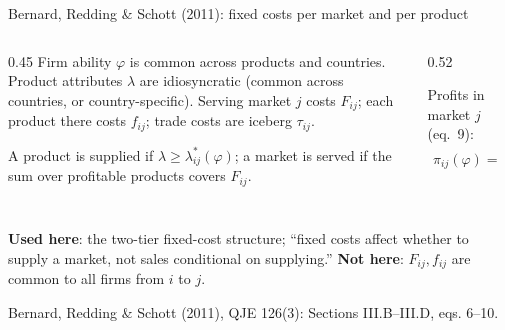 \documentclass[11pt,aspectratio=169,notes]{beamer}
\newcommand{\src}[1]{\par\vfill{\color{mute}\scriptsize #1\par}}
\begin{document}
\begin{frame}{Bernard, Redding \& Schott (2011): fixed costs per market and per product}
\vspace{0.15cm}
\begin{columns}[T]
\begin{column}{0.45\textwidth}
{\footnotesize Firm ability $\varphi$ is common across products and countries. Product attributes $\lambda$ are idiosyncratic (common across countries, or country-specific). Serving market $j$ costs $F_{ij}$; each product there costs $f_{ij}$; trade costs are iceberg $\tau_{ij}$.}
\vspace{0.2cm}

{\footnotesize A product is supplied if $\lambda\ge\lambda^*_{ij}(\varphi)$; a market is served if the sum over profitable products covers $F_{ij}$.}
\end{column}
\begin{column}{0.52\textwidth}
\begin{mathbox}
\footnotesize Profits in market $j$ (eq.~9):
\begin{align*}
\pi_{ij}(\varphi)=&\int_{\lambda^*_{ij}(\varphi)}^{\infty}\Big(\tfrac{r_{ij}(\varphi,\lambda)}{\sigma}-w_if_{ij}\Big)z(\lambda)\,d\lambda\\
&-\,w_iF_{ij}
\end{align*}
\end{mathbox}
\end{column}
\end{columns}
\vspace{0.15cm}
{\small\textbf{Used here}: the two-tier fixed-cost structure; ``fixed costs affect whether to supply a market, not sales conditional on supplying.'' \textbf{Not here}: $F_{ij},f_{ij}$ are common to all firms from $i$ to $j$.}
\src{Bernard, Redding \& Schott (2011), QJE 126(3): Sections III.B--III.D, eqs. 6--10.}
\end{frame}
\end{document}
